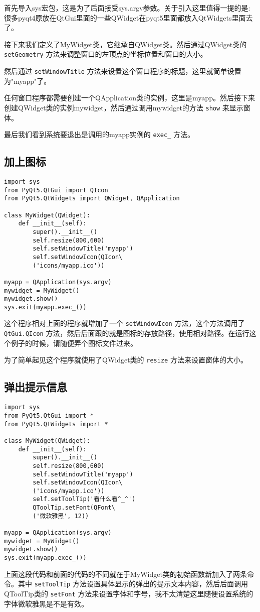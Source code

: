 \documentclass[11pt,oneside]{article}
\begin{document}
首先导入sys宏包，这是为了后面接受sys.argv参数。关于引入这里值得一提的是: 很多pyqt4原放在QtGui里面的一些QWidget在pyqt5里面都放入QtWidgets里面去了。

接下来我们定义了MyWidget类，它继承自QWidget类。然后通过QWidget类的 \texttt{setGeometry} 方法来调整窗口的左顶点的坐标位置和窗口的大小。

然后通过 \texttt{setWindowTitle} 方法来设置这个窗口程序的标题，这里就简单设置为"myapp"了。

任何窗口程序都需要创建一个QApplication类的实例，这里是myapp。然后接下来创建QWidget类的实例mywidget，然后通过调用mywidget的方法 \texttt{show} 来显示窗体。

最后我们看到系统要退出是调用的myapp实例的 \texttt{exec\_} 方法。


\subsection{加上图标}
\label{sec:orgheadline7}
\begin{verbatim}
import sys
from PyQt5.QtGui import QIcon
from PyQt5.QtWidgets import QWidget, QApplication

class MyWidget(QWidget):
    def __init__(self):
        super().__init__()
        self.resize(800,600)
        self.setWindowTitle('myapp')
        self.setWindowIcon(QIcon\
        ('icons/myapp.ico'))

myapp = QApplication(sys.argv)
mywidget = MyWidget()
mywidget.show()
sys.exit(myapp.exec_())
\end{verbatim}

这个程序相对上面的程序就增加了一个 \texttt{setWindowIcon} 方法，这个方法调用了 \texttt{QtGui.QIcon} 方法，然后后面跟的就是图标的存放路径，使用相对路径。在运行这个例子的时候，请随便弄个图标文件过来。

为了简单起见这个程序就使用了QWidget类的 \texttt{resize} 方法来设置窗体的大小。


\subsection{弹出提示信息}
\label{sec:orgheadline8}
\begin{verbatim}
import sys
from PyQt5.QtGui import *
from PyQt5.QtWidgets import *

class MyWidget(QWidget):
    def __init__(self):
        super().__init__()
        self.resize(800,600)
        self.setWindowTitle('myapp')
        self.setWindowIcon(QIcon\
        ('icons/myapp.ico'))
        self.setToolTip('看什么看^_^')
        QToolTip.setFont(QFont\
        ('微软雅黑', 12))

myapp = QApplication(sys.argv)
mywidget = MyWidget()
mywidget.show()
sys.exit(myapp.exec_())
\end{verbatim}
上面这段代码和前面的代码的不同就在于MyWidget类的初始函数新加入了两条命令。其中 \texttt{setToolTip} 方法设置具体显示的弹出的提示文本内容，然后后面调用QToolTip类的 \texttt{setFont} 方法来设置字体和字号，我不太清楚这里随便设置系统的字体微软雅黑是不是有效。
\end{document}

